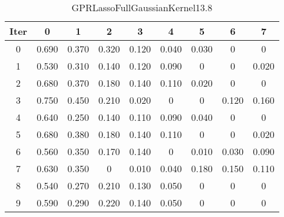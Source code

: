 \begin{table}
	\begin{center}
		\begin{tabular}{|c|c|c|c|c|c|c|c|c|}
			\hline
			Iter & 0 & 1 & 2 & 3 & 4 & 5 & 6 & 7 \\
			\hline
			0 & 0.690 & 0.370 & 0.320 & 0.120 & 0.040 & 0.030 & 0 & 0 \\
			\hline
			1 & 0.530 & 0.310 & 0.140 & 0.120 & 0.090 & 0 & 0 & 0.020 \\
			\hline
			2 & 0.680 & 0.370 & 0.180 & 0.140 & 0.110 & 0.020 & 0 & 0 \\
			\hline
			3 & 0.750 & 0.450 & 0.210 & 0.020 & 0 & 0 & 0.120 & 0.160 \\
			\hline
			4 & 0.640 & 0.250 & 0.140 & 0.110 & 0.090 & 0.040 & 0 & 0 \\
			\hline
			5 & 0.680 & 0.380 & 0.180 & 0.140 & 0.110 & 0 & 0 & 0.020 \\
			\hline
			6 & 0.560 & 0.350 & 0.170 & 0.140 & 0 & 0.010 & 0.030 & 0.090 \\
			\hline
			7 & 0.630 & 0.350 & 0 & 0.010 & 0.040 & 0.180 & 0.150 & 0.110 \\
			\hline
			8 & 0.540 & 0.270 & 0.210 & 0.130 & 0.050 & 0 & 0 & 0 \\
			\hline
			9 & 0.590 & 0.290 & 0.220 & 0.140 & 0.050 & 0 & 0 & 0 \\
			\hline
		\end{tabular}
	\end{center}
	\caption{GPRLassoFullGaussianKernel13.8}
\end{table}